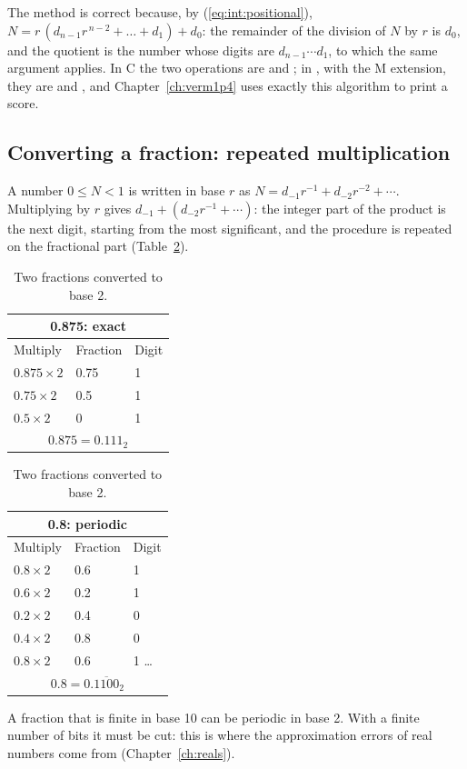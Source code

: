 The method is correct because, by (\ref{eq:int:positional}),
$N = r\,(d_{n-1}r^{\,n-2}+\dots+d_1) + d_0$: the remainder of the division of
$N$ by $r$ is $d_0$, and the quotient is the number whose digits are
$d_{n-1}\cdots d_1$, to which the same argument applies. In C the two
operations are \code{/} and \code{\%}; in \riscv, with the M extension, they
are  and , and Chapter~\ref{ch:verm1p4} uses exactly this
algorithm to print a score.

\subsection{Converting a fraction: repeated multiplication}

A number $0\le N<1$ is written in base $r$ as
$N = d_{-1}r^{-1}+d_{-2}r^{-2}+\cdots$. Multiplying by $r$ gives
$d_{-1} + (d_{-2}r^{-1}+\cdots)$: the integer part of the product is the next
digit, starting from the most significant, and the procedure is repeated on
the fractional part (Table~\ref{tab:int:fraction}).

\begin{table}[htb]
\centering\small
\caption{Two fractions converted to base 2.}\label{tab:int:fraction}
\begin{tabular}{@{}lll@{}}
\multicolumn{3}{c}{0.875: exact}\\\toprule
Multiply & Fraction & Digit\\\midrule
$0.875\times 2$ & 0.75 & 1\\ $0.75\times 2$ & 0.5 & 1\\ $0.5\times 2$ & 0 & 1\\\bottomrule
\multicolumn{3}{c}{$0.875 = 0.111_2$}
\end{tabular}\qquad\qquad
\begin{tabular}{@{}lll@{}}
\multicolumn{3}{c}{0.8: periodic}\\\toprule
Multiply & Fraction & Digit\\\midrule
$0.8\times 2$ & 0.6 & 1\\ $0.6\times 2$ & 0.2 & 1\\ $0.2\times 2$ & 0.4 & 0\\ $0.4\times 2$ & 0.8 & 0\\ $0.8\times 2$ & 0.6 & 1 \ldots\\\bottomrule
\multicolumn{3}{c}{$0.8 = 0.\overline{1100}_2$}
\end{tabular}
\end{table}

\begin{prgwarn}
A fraction that is finite in base 10 can be periodic in base 2. With a finite
number of bits it must be cut: this is where the approximation errors of real
numbers come from (Chapter~\ref{ch:reals}).
\end{prgwarn}

